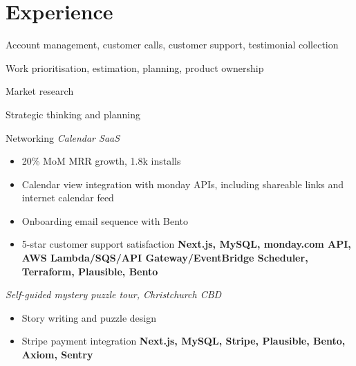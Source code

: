 \documentclass[a4paper,10pt]{article}
\begin{document}

          \section{Experience}


            \begin{resume_list}
              \item Account management, customer calls, customer support, testimonial collection
              \item Work prioritisation, estimation, planning, product ownership
              \item Market research
              \item Strategic thinking and planning
              \item Networking
              \vspace{5pt}
               \textit{Calendar SaaS}
              \begin{itemize}[itemsep=-2px, parsep=1pt, leftmargin=10pt]
                \item 20\% MoM MRR growth, 1.8k installs
                \item Calendar view integration with monday APIs, including shareable links and internet calendar feed
                \item Onboarding email sequence with Bento
                \item 5-star customer support satisfaction
                \newline \textbf{Next.js, MySQL, monday.com API, AWS Lambda/SQS/API Gateway/EventBridge Scheduler, Terraform, Plausible, Bento}
              \end{itemize}
              \vspace{5pt}
               \textit{Self-guided mystery puzzle tour, Christchurch CBD}
              \begin{itemize}[itemsep=-2px, parsep=1pt, leftmargin=10pt]
                \item Story writing and puzzle design
                \item Stripe payment integration
                \newline \textbf{Next.js, MySQL, Stripe, Plausible, Bento, Axiom, Sentry}

\end{itemize}
\end{resume_list}
\end{document}
